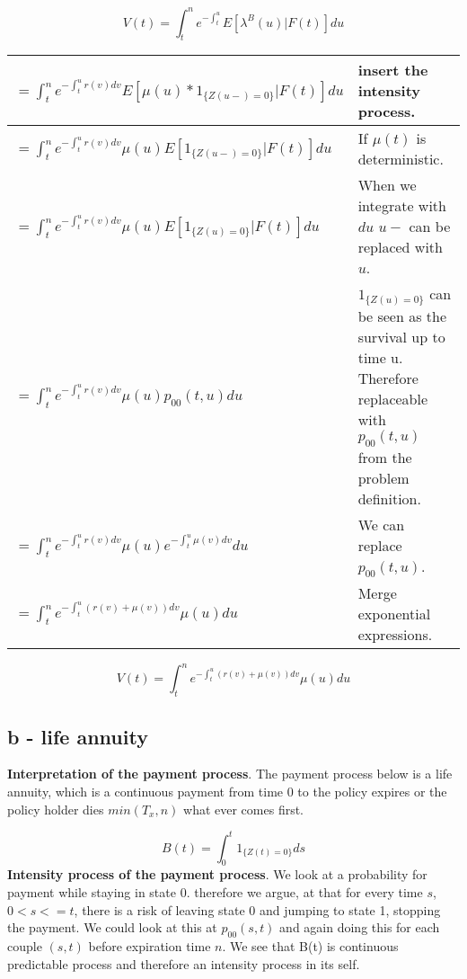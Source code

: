 \documentclass[12pt]{article}
\begin{document}
\begin{equation}
V(t) = \int_{t}^{n}e^{-\int_{t}^{u}}E[\lambda^B(u)|F(t)]du
\end{equation}

\begin{tabular}{l|p{5cm}}
$= \int_{t}^{n}e^{-\int_{t}^{u}r(v)dv}E[\mu(u) * 1_{\{Z(u-)=0\}}|F(t)]du$ & insert the intensity process. \\
\hline
$= \int_{t}^{n}e^{-\int_{t}^{u}r(v)dv}\mu(u) E[1_{\{Z(u-)=0\}}|F(t)]du$ & If $\mu(t)$ is deterministic. \\
\hline
$= \int_{t}^{n}e^{-\int_{t}^{u}r(v)dv}\mu(u) E[1_{\{Z(u)=0\}}|F(t)]du$ & When we integrate with $du$ $u-$ can be replaced with $u$. \\
\hline
$= \int_{t}^{n}e^{-\int_{t}^{u}r(v)dv}\mu(u) p_{00}(t,u) du$ &  $1_{\{Z(u)=0\}}$ can be seen as the survival up to time u. Therefore replaceable with $p_{00}(t,u)$ from the problem definition.\\
\hline
$= \int_{t}^{n}e^{-\int_{t}^{u}r(v)dv}\mu(u) e^{-\int_{t}^{u}\mu(v)dv} du$ & We can replace $p_{00}(t,u)$. \\
\hline
$= \int_{t}^{n}e^{-\int_{t}^{u}(r(v)+\mu(v))dv}\mu(u) du$ & Merge exponential expressions.
\end{tabular}

\begin{equation}
V(t) = \int_{t}^{n}e^{-\int_{t}^{u}(r(v)+\mu(v))dv}\mu(u) du
\end{equation}

\newpage

\subsection{b - life annuity}
\textbf{Interpretation of the payment process}. The payment process below is a life annuity, which is a continuous payment from time 0 to the policy expires or the policy holder dies $min(T_x,n)$ what ever comes first.

\begin{equation}
B(t) = \int_{0}^{t}1_{\{Z(t)=0\}}ds
\end{equation}
\textbf{Intensity process of the payment process}. We look at a probability for payment while staying in state 0. therefore we argue, at that for every time $s$, $0<s<=t$, there is a risk of leaving state 0 and jumping to state 1, stopping the payment. We could look at this at $p_{00}(s,t)$ and again doing this for each couple $(s,t)$ before expiration time $n$. We see that B(t) is continuous predictable process and therefore an intensity process in its self.
\end{document}
